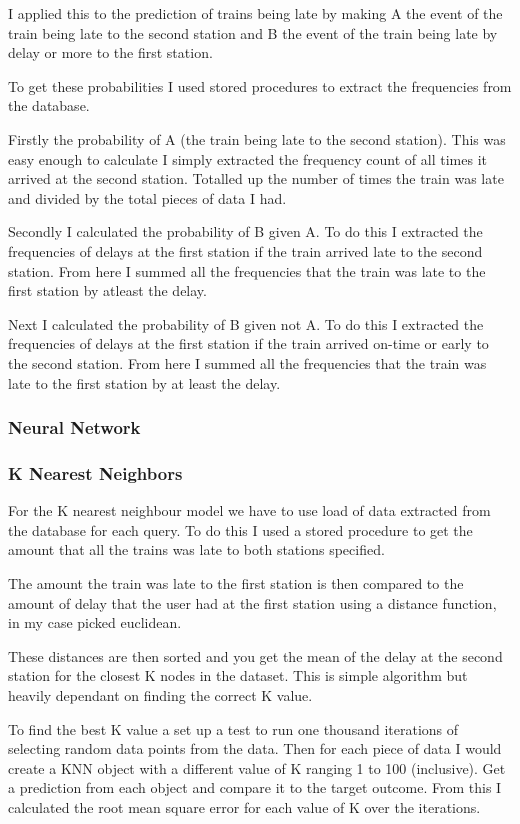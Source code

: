 \documentclass[11pt]{article}
\begin{document}
	I applied this to the prediction of trains being late by making A the event of the train being late to the second station and B the event of the train being late by delay or more to the first station.
	
	To get these probabilities I used stored procedures to extract the frequencies from the database.
	
	Firstly the probability of A (the train being late to the second station). This was easy enough to calculate I simply extracted the frequency count of all times it arrived at the second station. Totalled up the number of times the train was late and divided by the total pieces of data I had.
	
	Secondly I calculated the probability of B given A. To do this I extracted the frequencies of delays at the first station if the train arrived late to the second station. From here I summed all the frequencies that the train was late to the first station by atleast the delay.
	
	Next I calculated the probability of B given not A. To do this I extracted the frequencies of delays at the first station if the train arrived on-time or early to the second station. From here I summed all the frequencies that the train was late to the first station by at least the delay.	
	
	\subsubsection{Neural Network}
	\subsubsection{K Nearest Neighbors}		
	
	For the K nearest neighbour model we have to use load of data extracted from the database for each query. To do this I used a stored procedure to get the amount that all the trains was late to both stations specified. 
	
	The amount the train was late to the first station is then compared to the amount of delay that the user had at the first station using a distance function, in my case picked euclidean.
	
	These distances are then sorted and you get the mean of the delay at the second station for the closest K nodes in the dataset. This is simple algorithm but heavily dependant on finding the correct K value.
	
	To find the best K value a set up a test to run one thousand iterations of selecting random data points from the data. Then for each piece of data I would create a KNN object with a different value of K ranging 1 to 100 (inclusive). Get a prediction from each object and compare it to the target outcome. From this I calculated the root mean square error for each value of K over the iterations.
	
\end{document}
